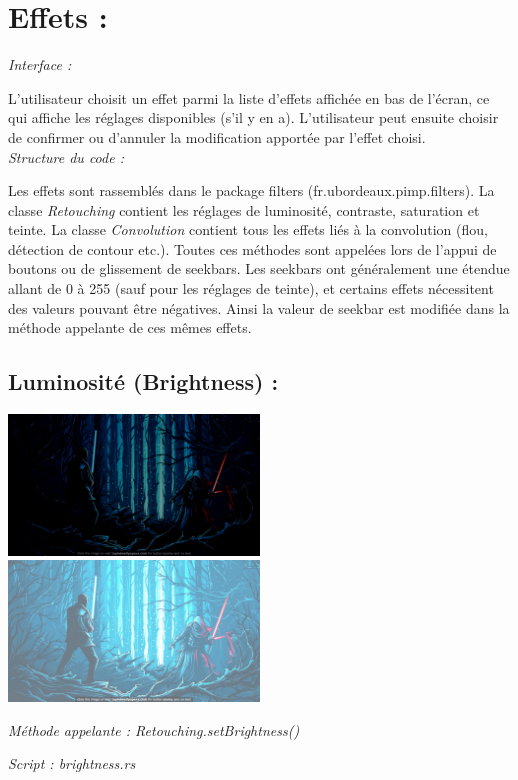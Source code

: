 \section{Effets :}
\emph{Interface :}

L'utilisateur choisit un effet parmi la liste d'effets affichée en bas de l'écran, ce qui affiche les 
réglages disponibles (s'il y en a). L'utilisateur peut ensuite choisir de confirmer ou d'annuler la modification
apportée par l'effet choisi.
\\

\emph{Structure du code :}

Les effets sont rassemblés dans le package filters (fr.ubordeaux.pimp.filters).
La classe \emph{Retouching} contient les réglages de luminosité, contraste, saturation et teinte.
La classe \emph{Convolution} contient tous les effets liés à la convolution (flou, détection de contour etc.).
Toutes ces méthodes sont appelées lors de l'appui de boutons ou de glissement de seekbars. Les seekbars ont généralement
une étendue allant de 0 à 255 (sauf pour les réglages de teinte), et certains effets nécessitent des valeurs pouvant être
négatives. Ainsi la valeur de seekbar est modifiée dans la méthode appelante de ces mêmes effets.
\subsection{Luminosité (Brightness) :}
\includegraphics[width=0.5\textwidth]{report_src/brightness_low.jpeg}
\includegraphics[width=0.5\textwidth]{report_src/brightness_high.jpeg}

\emph{Méthode appelante : Retouching.setBrightness()}

\emph{Script : brightness.rs}
\\

